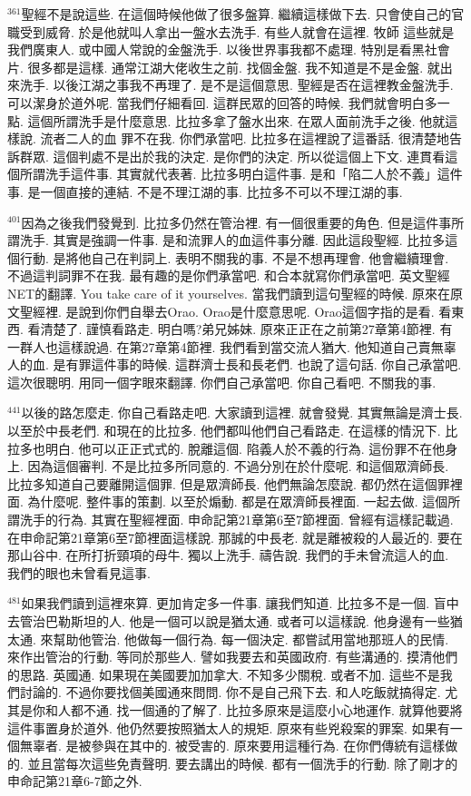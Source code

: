 \documentclass{book}
\begin{document}
$^{361}$聖經不是說這些.
在這個時候他做了很多盤算.
繼續這樣做下去.
只會使自己的官職受到威脅.
於是他就叫人拿出一盤水去洗手.
有些人就會在這裡.
牧師 這些就是我們廣東人.
或中國人常說的金盤洗手.
以後世界事我都不處理.
特別是看黑社會片.
很多都是這樣.
通常江湖大佬收生之前.
找個金盤.
我不知道是不是金盤.
就出來洗手.
以後江湖之事我不再理了.
是不是這個意思.
聖經是否在這裡教金盤洗手.
可以潔身於道外呢.
當我們仔細看回.
這群民眾的回答的時候.
我們就會明白多一點.
這個所謂洗手是什麼意思.
比拉多拿了盤水出來.
在眾人面前洗手之後.
他就這樣說.
流者二人的血 罪不在我.
你們承當吧.
比拉多在這裡說了這番話.
很清楚地告訴群眾.
這個判處不是出於我的決定.
是你們的決定.
所以從這個上下文.
連貫看這個所謂洗手這件事.
其實就代表著.
比拉多明白這件事.
是和「陷二人於不義」這件事.
是一個直接的連結.
不是不理江湖的事.
比拉多不可以不理江湖的事.

$^{401}$因為之後我們發覺到.
比拉多仍然在管治裡.
有一個很重要的角色.
但是這件事所謂洗手.
其實是強調一件事.
是和流罪人的血這件事分離.
因此這段聖經.
比拉多這個行動.
是將他自己在判詞上.
表明不關我的事.
不是不想再理會.
他會繼續理會.
不過這判詞罪不在我.
最有趣的是你們承當吧.
和合本就寫你們承當吧.
英文聖經NET的翻譯.
You take care of it yourselves.
當我們讀到這句聖經的時候.
原來在原文聖經裡.
是說到你們自舉去Orao.
Orao是什麼意思呢.
Orao這個字指的是看.
看東西.
看清楚了.
謹慎看路走.
明白嗎?弟兄姊妹.
原來正正在之前第27章第4節裡.
有一群人也這樣說過.
在第27章第4節裡.
我們看到當交流人猶大.
他知道自己賣無辜人的血.
是有罪這件事的時候.
這群濟士長和長老們.
也說了這句話.
你自己承當吧.
這次很聰明.
用同一個字眼來翻譯.
你們自己承當吧.
你自己看吧.
不關我的事.

$^{441}$以後的路怎麼走.
你自己看路走吧.
大家讀到這裡.
就會發覺.
其實無論是濟士長.
以至於中長老們.
和現在的比拉多.
他們都叫他們自己看路走.
在這樣的情況下.
比拉多也明白.
他可以正正式式的.
脫離這個.
陷義人於不義的行為.
這份罪不在他身上.
因為這個審判.
不是比拉多所同意的.
不過分別在於什麼呢.
和這個眾濟師長.
比拉多知道自己要離開這個罪.
但是眾濟師長.
他們無論怎麼說.
都仍然在這個罪裡面.
為什麼呢.
整件事的策劃.
以至於煽動.
都是在眾濟師長裡面.
一起去做.
這個所謂洗手的行為.
其實在聖經裡面.
申命記第21章第6至7節裡面.
曾經有這樣記載過.
在申命記第21章第6至7節裡面這樣說.
那誠的中長老.
就是離被殺的人最近的.
要在那山谷中.
在所打折頸項的母牛.
獨以上洗手.
禱告說.
我們的手未曾流這人的血.
我們的眼也未曾看見這事.

$^{481}$如果我們讀到這裡來算.
更加肯定多一件事.
讓我們知道.
比拉多不是一個.
盲中去管治巴勒斯坦的人.
他是一個可以說是猶太通.
或者可以這樣說.
他身邊有一些猶太通.
來幫助他管治.
他做每一個行為.
每一個決定.
都嘗試用當地那班人的民情.
來作出管治的行動.
等同於那些人.
譬如我要去和英國政府.
有些溝通的.
摸清他們的思路.
英國通.
如果現在美國要加加拿大.
不知多少關稅.
或者不加.
這些不是我們討論的.
不過你要找個美國通來問問.
你不是自己飛下去.
和人吃飯就搞得定.
尤其是你和人都不通.
找一個通的了解了.
比拉多原來是這麼小心地運作.
就算他要將這件事置身於道外.
他仍然要按照猶太人的規矩.
原來有些兇殺案的罪案.
如果有一個無辜者.
是被參與在其中的.
被受害的.
原來要用這種行為.
在你們傳統有這樣做的.
並且當每次這些免責聲明.
要去講出的時候.
都有一個洗手的行動.
除了剛才的申命記第21章6-7節之外.
\end{document}

